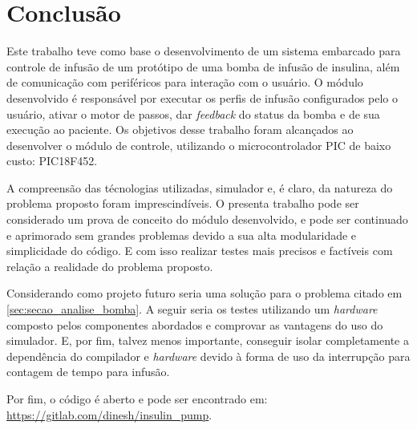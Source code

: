 \chapter{Conclusão}

Este trabalho teve como base o desenvolvimento de um sistema embarcado para controle de infusão de um protótipo de uma bomba de infusão de insulina, além de comunicação com periféricos para interação com o usuário. O módulo desenvolvido é responsável por executar os perfis de infusão configurados pelo o usuário, ativar o motor de passos, dar \emph{feedback} do status da bomba e de sua execução ao paciente. Os objetivos desse trabalho foram alcançados ao desenvolver o módulo de controle, utilizando o microcontrolador PIC de baixo custo: PIC18F452. 

A compreensão das técnologias utilizadas, simulador e, é claro, da natureza do problema proposto foram imprescindíveis. O presenta trabalho pode ser considerado um prova de conceito do módulo desenvolvido, e pode ser continuado e aprimorado sem grandes problemas devido a sua alta modularidade e simplicidade do código. E com isso realizar testes mais precisos e factíveis com relação a realidade do problema proposto. 

Considerando como projeto futuro seria uma solução para o problema citado em \ref{sec:secao_analise_bomba}. A seguir seria os testes utilizando um \emph{hardware} composto pelos componentes abordados e comprovar as vantagens do uso do simulador. E, por fim, talvez menos importante, conseguir isolar completamente a dependência do compilador e \emph{hardware} devido à forma de uso da interrupção para contagem de tempo para infusão.

Por fim, o código é aberto e pode ser encontrado em: \url{https://gitlab.com/dinesh/insulin_pump}.